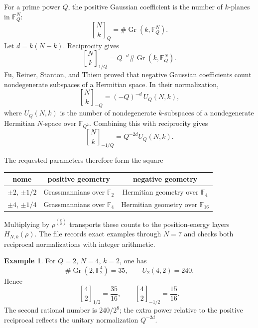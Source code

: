 \documentclass[11pt,oneside]{article}
\numberwithin{equation}{section}
\theoremstyle{definition}
\newtheorem{example}[theorem]{Example}
\theoremstyle{remark}
\newcommand{\qbinom}[3]{\genfrac{[}{]}{0pt}{}{#1}{#2}_{#3}}
\newcommand{\Gr}{\operatorname{Gr}}
\begin{document}
For a prime power $Q$, the positive Gaussian coefficient is the number of
$k$-planes in $\mathbb F_Q^N$:
\begin{equation}
 \qbinom{N}{k}{Q}=\#\Gr(k,\mathbb F_Q^N).
 \label{eq:Grassmann}
\end{equation}
Let $d=k(N-k)$.  Reciprocity gives
\begin{equation}
 \qbinom{N}{k}{1/Q}
 =Q^{-d}\#\Gr(k,\mathbb F_Q^N).
 \label{eq:Grassmann-reciprocal}
\end{equation}
Fu, Reiner, Stanton, and Thiem proved that negative Gaussian coefficients count
nondegenerate subspaces of a Hermitian space.  In their normalization,
\begin{equation}
 \qbinom{N}{k}{-Q}=(-Q)^{-d}\,U_Q(N,k),
 \label{eq:unitary-negative-q}
\end{equation}
where $U_Q(N,k)$ is the number of nondegenerate $k$-subspaces of a
nondegenerate Hermitian $N$-space over $\mathbb F_{Q^2}$.  Combining this with
reciprocity gives
\begin{equation}
 \qbinom{N}{k}{-1/Q}=Q^{-2d}U_Q(N,k).
 \label{eq:unitary-reciprocal}
\end{equation}

The requested parameters therefore form the square
\begin{center}
\begin{tabular}{c c c}
\toprule
nome & positive geometry & negative geometry \\
\midrule
$\pm2$, $\pm1/2$ & Grassmannians over $\mathbb F_2$ & Hermitian geometry over $\mathbb F_4$ \\
$\pm4$, $\pm1/4$ & Grassmannians over $\mathbb F_4$ & Hermitian geometry over $\mathbb F_{16}$ \\
\bottomrule
\end{tabular}
\end{center}
Multiplying by $\rho^{\binom k2}$ transports these counts to the
position-energy layers $H_{N,k}(\rho)$.  The file
 records exact examples through
$N=7$ and checks both reciprocal normalizations with integer arithmetic.

\begin{example}
For $Q=2$, $N=4$, $k=2$, one has
\[
 \#\Gr(2,\mathbb F_2^4)=35,
 \qquad U_2(4,2)=240.
\]
Hence
\[
 \qbinom42{1/2}=\frac{35}{16},
 \qquad
 \qbinom42{-1/2}=\frac{15}{16}.
\]
The second rational number is $240/2^8$; the extra power relative to the
positive reciprocal reflects the unitary normalization $Q^{-2d}$.
\end{example}
\end{document}
